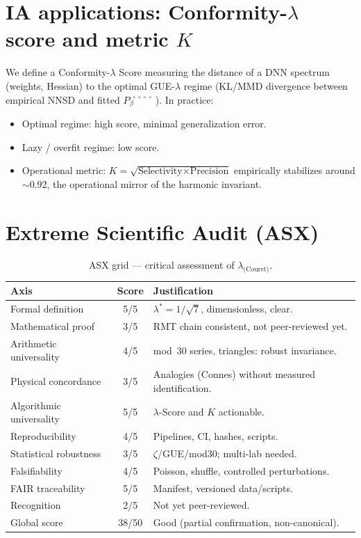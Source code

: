 \documentclass[11pt,a4paper]{article}
\def\lambda{λ}%
\def\beta{β̉̉̉̉}%
\def\textbf#1{#1}%
\def\emph#1{#1}%
\begin{document}
\section{IA applications: Conformity-\texorpdfstring{$\lambda$}{lambda} score and metric \texorpdfstring{$K$}{K}}
We define a \emph{Conformity-$\lambda$ Score} measuring the distance of a DNN spectrum (weights, Hessian) to the optimal GUE-$\lambda$ regime (KL/MMD divergence between empirical NNSD and fitted $P_\beta$).
In practice:
\begin{itemize}
  \item \textbf{Optimal regime}: high score, minimal generalization error.
  \item \textbf{Lazy / overfit regime}: low score.
  \item \textbf{Operational metric}: $K=\sqrt{\text{Selectivity}\times\text{Precision}}$ empirically stabilizes around $\sim 0.92$, the operational mirror of the harmonic invariant.
\end{itemize}

\section{Extreme Scientific Audit (ASX)}
\begin{table}[H]
\centering
\small
\begin{tabular}{p{4.8cm} c p{9cm}}
\toprule
\textbf{Axis} & \textbf{Score} & \textbf{Justification}\\
\midrule
Formal definition & 5/5 & $\lambda^\ast = 1/\sqrt{7}$, dimensionless, clear.\\
Mathematical proof & 3/5 & RMT chain consistent, not peer-reviewed yet.\\
Arithmetic universality & 4/5 & mod~30 series, triangles: robust invariance.\\
Physical concordance & 3/5 & Analogies (Connes) without measured identification.\\
Algorithmic universality & 5/5 & $\lambda$-Score and $K$ actionable.\\
Reproducibility & 4/5 & Pipelines, CI, hashes, scripts.\\
Statistical robustness & 3/5 & $ζ$/GUE/mod30; multi-lab needed.\\
Falsifiability & 4/5 & Poisson, shuffle, controlled perturbations.\\
FAIR traceability & 5/5 & Manifest, versioned data/scripts.\\
Recognition & 2/5 & Not yet peer-reviewed.\\
\midrule
\textbf{Global score} & \textbf{38/50} & Good (partial confirmation, non-canonical).\\
\bottomrule
\end{tabular}
\caption{ASX grid — critical assessment of $\lambda_{\text{(Couret)}}$.}
\end{table}
\end{document}
